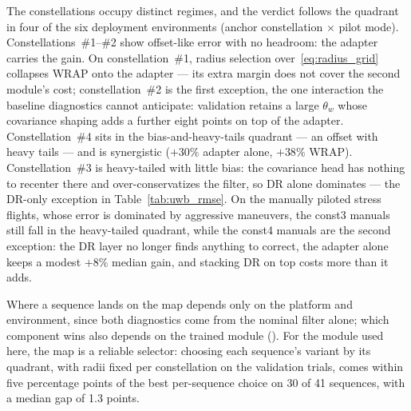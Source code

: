 The constellations occupy distinct regimes, and the verdict follows the quadrant in four of the six deployment environments (anchor constellation \(\times\) pilot mode). Constellations~\#1--\#2 show offset-like error with no headroom: the adapter carries the gain. On constellation~\#1, radius selection over~\eqref{eq:radius_grid} collapses WRAP onto the adapter --- its extra margin does not cover the second module's cost; constellation~\#2 is the first exception, the one interaction the baseline diagnostics cannot anticipate: validation retains a large \(\theta_w\) whose covariance shaping adds a further eight points on top of the adapter. Constellation~\#4 sits in the bias-and-heavy-tails quadrant --- an offset with heavy tails --- and is synergistic (\(+30\%\) adapter alone, \(+38\%\) WRAP). Constellation~\#3 is heavy-tailed with little bias: the covariance head has nothing to recenter there and over-conservatizes the filter, so DR alone dominates --- the DR-only exception in Table~\ref{tab:uwb_rmse}. On the manually piloted stress flights, whose error is dominated by aggressive maneuvers, the const3 manuals still fall in the heavy-tailed quadrant, while the const4 manuals are the second exception: the DR layer no longer finds anything to correct, the adapter alone keeps a modest \(+8\%\) median gain, and stacking DR on top costs more than it adds.

Where a sequence lands on the map depends only on the platform and environment, since both diagnostics come from the nominal filter alone; which component wins also depends on the trained module (). For the module used here, the map is a reliable selector: choosing each sequence's variant by its quadrant, with radii fixed per constellation on the validation trials, comes within five percentage points of the best per-sequence choice on 30 of 41 sequences, with a median gap of 1.3 points.
